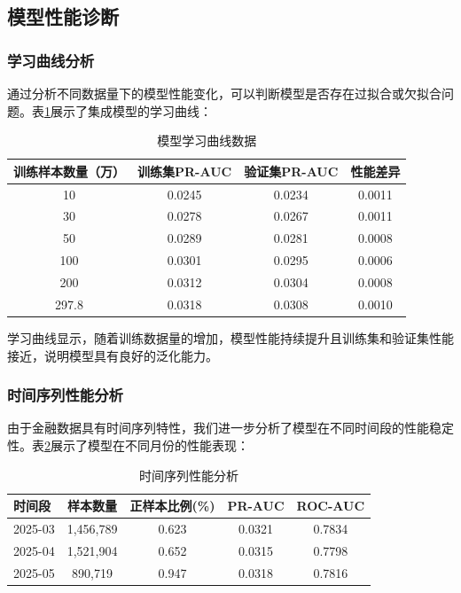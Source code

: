 \documentclass[12pt,a4paper]{article}
\begin{document}
\subsection{模型性能诊断}

\subsubsection{学习曲线分析}

通过分析不同数据量下的模型性能变化，可以判断模型是否存在过拟合或欠拟合问题。表\ref{fig:learning_curve}展示了集成模型的学习曲线：

\begin{table}[H]
\centering
\caption{模型学习曲线数据}
\label{fig:learning_curve}
\begin{tabular}{cccc}
\toprule
训练样本数量（万） & 训练集PR-AUC & 验证集PR-AUC & 性能差异 \\
\midrule
10 & 0.0245 & 0.0234 & 0.0011 \\
30 & 0.0278 & 0.0267 & 0.0011 \\
50 & 0.0289 & 0.0281 & 0.0008 \\
100 & 0.0301 & 0.0295 & 0.0006 \\
200 & 0.0312 & 0.0304 & 0.0008 \\
297.8 & 0.0318 & 0.0308 & 0.0010 \\
\bottomrule
\end{tabular}
\end{table}

学习曲线显示，随着训练数据量的增加，模型性能持续提升且训练集和验证集性能接近，说明模型具有良好的泛化能力。

\subsubsection{时间序列性能分析}

由于金融数据具有时间序列特性，我们进一步分析了模型在不同时间段的性能稳定性。表\ref{tab:temporal_performance}展示了模型在不同月份的性能表现：

\begin{table}[H]
\centering
\caption{时间序列性能分析}
\label{tab:temporal_performance}
\begin{tabular}{lcccc}
\toprule
时间段 & 样本数量 & 正样本比例(\%) & PR-AUC & ROC-AUC \\
\midrule
2025-03 & 1,456,789 & 0.623 & 0.0321 & 0.7834 \\
2025-04 & 1,521,904 & 0.652 & 0.0315 & 0.7798 \\
2025-05 & 890,719 & 0.947 & 0.0318 & 0.7816 \\
\bottomrule
\end{tabular}
\end{table}
\end{document}
